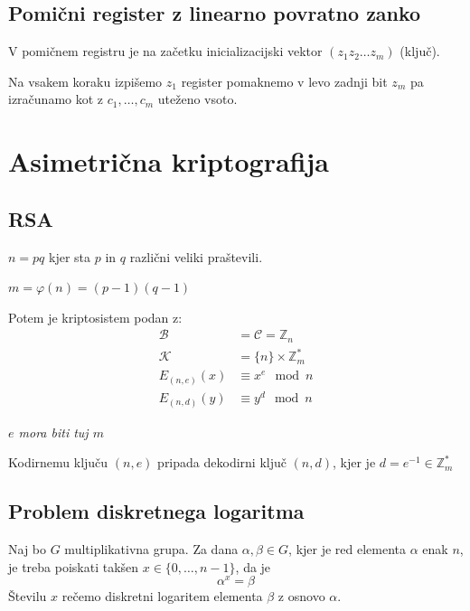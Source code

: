 \begin{multicols}{5}
\subsection*{Pomični register z linearno povratno zanko}
V pomičnem registru je na začetku inicializacijski vektor $(z_1 z_2 \dots z_m)$ (ključ).

Na vsakem koraku izpišemo $z_1$ register pomaknemo v levo zadnji bit $z_m$ pa 
izračunamo kot z $c_1, \dots, c_m$ uteženo vsoto.

\begin{center}
\end{center}

\section*{Asimetrična kriptografija}
\subsection*{RSA}
$n = pq$ kjer sta $p$ in $q$ različni veliki praštevili.

$m = \varphi(n) = (p-1)(q-1)$

Potem je kriptosistem podan z:
\begin{align*}
	\mathcal{B} &= \mathcal{C} = \mathbb{Z}_n \\
	\mathcal{K} &= \{n\} \times \mathbb{Z}_m^* \\
	E_{(n,e)}(x) &\equiv x^e \mod n \\
	E_{(n,d)}(y) &\equiv y^d \mod n
\end{align*}

\textit{$e$ mora biti tuj $m$}

Kodirnemu ključu $(n, e)$ pripada dekodirni ključ $(n, d)$, kjer je $d = e^{-1} \in \mathbb{Z}_m^*$

\subsection*{Problem diskretnega logaritma}
Naj bo $G$ multiplikativna grupa. Za dana $\alpha, \beta \in G$, kjer je red elementa $\alpha$ enak $n$, 
je treba poiskati takšen $x \in \{0, \dots, n-1\}$, da je
\[ \alpha^x = \beta\]
Številu $x$ rečemo diskretni logaritem elementa $\beta$ z osnovo $\alpha$.


\end{multicols}
